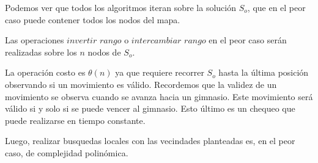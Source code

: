 Podemos ver que todos los algoritmos iteran sobre la solución $S_o$, que en el peor caso puede contener todos los nodos del mapa. 

Las operaciones $invertir$ $rango$ o $intercambiar$ $rango$ en el peor caso serán realizadas sobre los $n$ nodos de $S_o$.

La operación costo es $\theta(n)$ ya que requiere recorrer $S_o$ hasta la última posición observando si un movimiento es válido. Recordemos que la validez de un movimiento se observa cuando se avanza hacia un gimnasio. Este movimiento será válido si y solo si se puede vencer al gimnasio. Esto último es un chequeo que puede realizarse en tiempo constante.  

Luego, realizar busquedas locales con las vecindades planteadas es, en el peor caso, de complejidad polinómica. 


